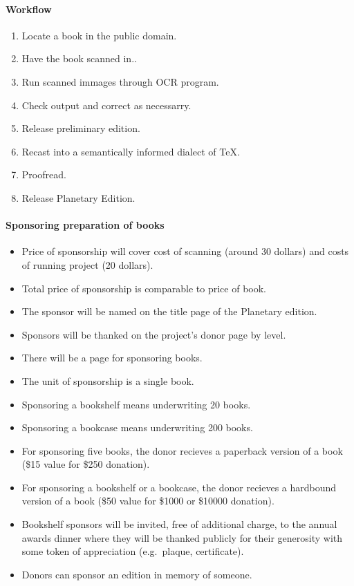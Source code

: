 \paragraph{Workflow}

\begin{enumerate}
\item Locate a book in the public domain. 
\item Have the book scanned in.. 
\item Run scanned immages through OCR program. 
\item Check output and correct as necessarry. 
\item Release preliminary edition. 
\item Recast into a semantically informed dialect of TeX. 
\item Proofread. 
\item Release Planetary Edition.
\end{enumerate}

\paragraph{Sponsoring preparation of books}

\begin{itemize}
\item
  Price of sponsorship will cover cost of scanning (around 30 dollars)
  and costs of running project (20 dollars).
\item
  Total price of sponsorship is comparable to price of book.
\item
  The sponsor will be named on the title page of the Planetary edition.
\item
  Sponsors will be thanked on the project's donor page by level.
\item
  There will be a page for sponsoring books.
\item
  The unit of sponsorship is a single book.
\item
  Sponsoring a bookshelf means underwriting 20 books.
\item
  Sponsoring a bookcase means underwriting 200 books.
\item
  For sponsoring five books, the donor recieves a paperback version of a
  book (\$15 value for \$250 donation).
\item
  For sponsoring a bookshelf or a bookcase, the donor recieves a
  hardbound version of a book (\$50 value for \$1000 or \$10000
  donation).
\item
  Bookshelf sponsors will be invited, free of additional charge, to the
  annual awards dinner where they will be thanked publicly for their
  generosity with some token of appreciation (e.g.~plaque, certificate).
\item
  Donors can sponsor an edition in memory of someone.
\end{itemize}


